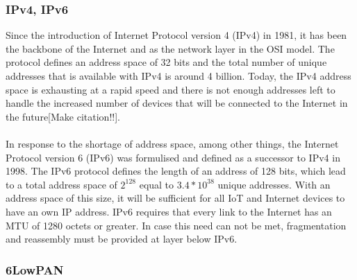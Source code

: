 \subsubsection{IPv4, IPv6}
Since the introduction of Internet Protocol version 4 (IPv4) in 1981\cite{rfc791}, it has been the backbone of the Internet and as the network layer in the OSI model. The protocol defines an address space of 32 bits and the total number of unique addresses that is available with IPv4 is around 4 billion. Today, the IPv4 address space is exhausting at a rapid speed and there is not enough addresses left to handle the increased number of devices that will be connected to the Internet in the future[Make citation!!].
\\\\
In response to the shortage of address space, among other things, the Internet Protocol version 6 (IPv6) was formulised and defined as a successor to IPv4 in 1998\cite{rfc2460}. The IPv6 protocol defines the length of an address of 128 bits, which lead to a total address space of ${2^{128}}$ equal to ${3.4*10^{38}}$ unique addresses. With an address space of this size, it will be sufficient for all IoT and Internet devices to have an own IP address. IPv6 requires that every link to the Internet has an MTU of 1280 octets or greater. In case this need can not be met,  fragmentation and reassembly must be provided at layer below IPv6\cite{rfc2460}.



\subsubsection{6LowPAN}


